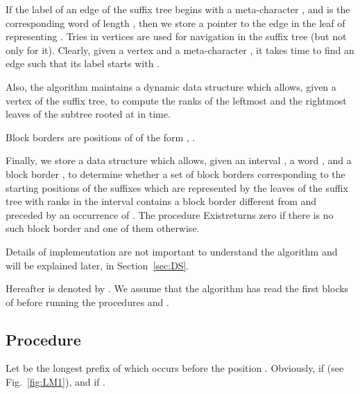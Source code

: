 \documentclass[10pt]{llncs}
\newcommand{\exist}{{\sc Exist}}
\begin{document}
If the label of an edge  of the suffix tree begins with a meta-character , and  is the corresponding word of length , then we store a pointer to the edge  in the leaf of  representing . Tries in vertices are used for navigation in the suffix tree (but not only for it). Clearly, given a vertex  and a meta-character , it takes  time to find an edge  such that its label starts with .

Also, the algorithm maintains a dynamic data structure which allows, given a vertex  of the suffix tree, to compute the ranks of the leftmost and the rightmost leaves of the subtree rooted at  in  time. 

\begin{definition}
	Block borders are positions of  of the form , .
\end{definition}

Finally, we store a data structure which allows, given an interval , a word , and a block border , to determine whether a set of block borders corresponding to the starting positions of the suffixes which are represented by the leaves of the suffix tree with ranks in the interval  contains a block border different from  and preceded by an occurrence of . The procedure \exist returns zero if there is no such block border and one of them otherwise.

Details of implementation are not important to understand the algorithm and will be explained later, in Section~\ref{sec:DS}.

Hereafter  is denoted by . We assume that the algorithm has read the first  blocks of  before running the procedures  and .

\subsection{Procedure }
\label{sec:<r}
Let  be the longest prefix of  which occurs before the position . Obviously,  if  (see Fig.~\ref{fig:LM1}), and   if .
\end{document}
